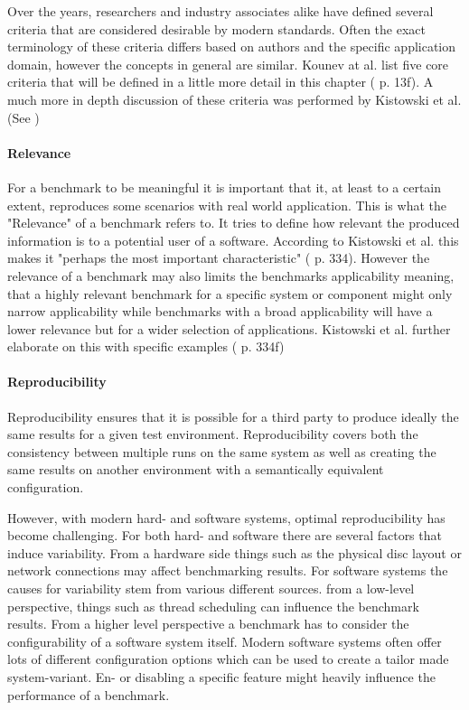 \documentclass[	runningheads,
				a4paper]{llncs}
\begin{document}
Over the years, researchers and industry associates alike have defined several criteria that are considered desirable by modern standards. Often the exact terminology of these criteria differs based on authors and the specific application domain, however the concepts in general are similar. Kounev at al. list five core criteria that will be defined in a little more detail in this chapter (\cite{Kounev} p. 13f). A much more in depth discussion of these criteria was performed by Kistowski et al. (See \cite{kistowski2015})

\paragraph{Relevance} For a benchmark to be meaningful it is important that it, at least to a certain extent, reproduces some scenarios with real world application. This is what the "Relevance" of a benchmark refers to. It tries to define how relevant the produced information is to a potential user of a software. According to Kistowski et al. this makes it "perhaps the most important characteristic" (\cite{kistowski2015} p. 334). However the relevance of a benchmark may also limits the benchmarks applicability meaning, that a highly relevant benchmark for a specific system or component might only narrow applicability while benchmarks with a broad applicability will have a lower relevance but for a wider selection of applications. Kistowski et al. further elaborate on this with specific examples (\cite{kistowski2015} p. 334f)

\paragraph{Reproducibility} Reproducibility ensures that it is possible for a third party to produce ideally the same results for a given test environment. Reproducibility covers both the consistency between multiple runs on the same system as well as creating the same results on another environment with a semantically equivalent configuration. 

However, with modern hard- and software systems, optimal reproducibility has become challenging. For both hard- and software there are several factors that induce variability. From a hardware side things such as the physical disc layout or network connections may affect benchmarking results. For software systems the causes for variability stem from various different sources. from a low-level perspective, things such as thread scheduling can influence the benchmark results. From a higher level perspective a benchmark has to consider the configurability of a software system itself. Modern software systems often offer lots of different configuration options which can be used to create a tailor made system-variant. En- or disabling a specific feature might heavily influence the performance of a benchmark.
\end{document}
